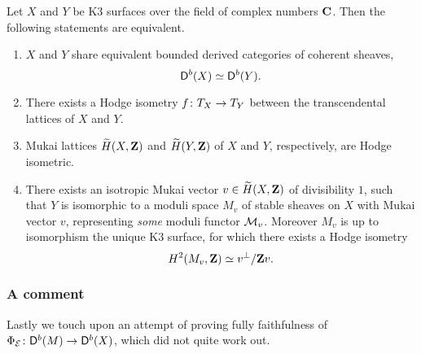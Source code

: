 \begin{theorem}
    \label{Derived torelli at the end}
    Let $X$ and $Y$ be K3 surfaces over the field of complex numbers $\mathbf C$. Then the following statements are equivalent.
    \begin{enumerate}[label = (\roman*)]
        \item{$X$ and $Y$ share equivalent bounded derived categories of coherent sheaves, 
        \[
            \mathsf{D}^b(X) \simeq \mathsf{D}^b(Y).
        \]
        }
        \item{There exists a Hodge isometry $f \colon T_{X} \to T_{Y}$ between the transcendental lattices of $X$ and $Y$.}
        \item{Mukai lattices $\widetilde{H}(X, \mathbf Z)$ and $\widetilde{H}(Y, \mathbf Z)$ of $X$ and $Y$, respectively, are Hodge isometric. 
        }
        \item{There exists 
        an isotropic Mukai vector $v \in \widetilde{H}(X, \mathbf Z)$ of divisibility $1$,
        such that $Y$ is isomorphic to a moduli space $M_v$ of stable sheaves on $X$ with Mukai vector $v$, representing \emph{some} moduli functor $\mathcal M_v$. Moreover $M_v$ is up to isomorphism the unique K3 surface, for which there exists a Hodge isometry
        \[
            H^{2}(M_v, \mathbf Z) \simeq v^\perp / \mathbf Z v.
        \]
        }
    \end{enumerate}
\end{theorem}


\subsubsection*{A comment}

Lastly we touch upon an attempt of proving fully faithfulness of $\Phi_{\mathcal E} \colon \mathsf{D}^b(M) \to \mathsf{D}^b(X)$, which did not quite work out.